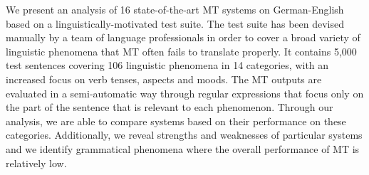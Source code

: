 We present an analysis of 16 state-of-the-art MT systems on German-English based on a linguistically-motivated test suite. The test suite has been devised manually by a team of language professionals in order to cover a broad variety of linguistic phenomena that MT often fails to translate properly. It contains 5,000 test sentences covering 106 linguistic phenomena in 14 categories, with an increased focus on verb tenses, aspects and moods. The MT outputs are evaluated in a semi-automatic way through regular expressions that focus only on the part of the sentence that is relevant to each phenomenon. Through our analysis, we are able to compare systems based on their performance on these categories. Additionally, we reveal strengths and weaknesses of particular systems and we identify grammatical phenomena where the overall performance of MT is relatively low.
